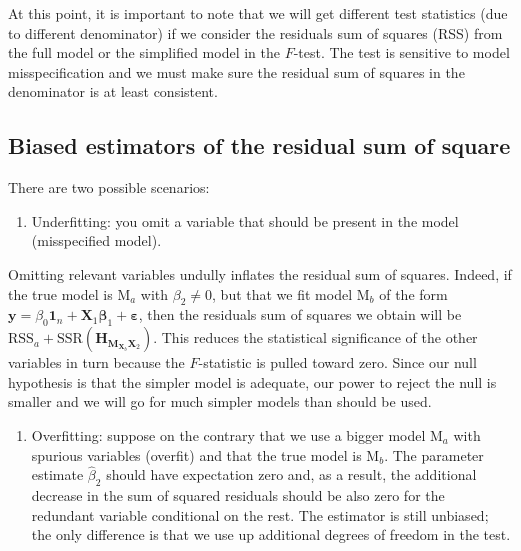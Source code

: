 \documentclass[]{book}
\providecommand{\tightlist}{%
  \setlength{\itemsep}{0pt}\setlength{\parskip}{0pt}}
\theoremstyle{definition}
\theoremstyle{definition}
\theoremstyle{definition}
\theoremstyle{remark}
\begin{document}
At this point, it is important to note that we will get different test statistics (due to different denominator) if we consider the residuals sum of squares (RSS) from the full model or the simplified model in the \(F\)-test. The test is sensitive to model misspecification and we must make sure the residual sum of squares in the denominator is at least consistent.

\hypertarget{biased-rss}{%
\subsection{Biased estimators of the residual sum of square}\label{biased-rss}}

There are two possible scenarios:

\begin{enumerate}
\def\labelenumi{\arabic{enumi}.}
\tightlist
\item
  Underfitting: you omit a variable that should be present in the model (misspecified model).
\end{enumerate}

Omitting relevant variables undully inflates the residual sum of squares. Indeed, if the true model is \(\mathrm{M}_a\) with \(\beta_2 \neq 0\), but that we fit model \(\mathrm{M}_b\) of the form \(\boldsymbol{y} = \beta_0\mathbf{1}_n + \mathbf{X}_1\boldsymbol{\beta}_1 + \boldsymbol{\varepsilon}\), then the residuals sum of squares we obtain will be \(\mathrm{RSS}_{a} + \mathrm{SSR}( \mathbf{H}_{\mathbf{M}_{\mathbf{X}_b}\mathbf{X}_2})\). This reduces the statistical significance of the other variables in turn because the \(F\)-statistic is pulled toward zero. Since our null hypothesis is that the simpler model is adequate, our power to reject the null is smaller and we will go for much simpler models than should be used.

\begin{enumerate}
\def\labelenumi{\arabic{enumi}.}
\setcounter{enumi}{1}
\tightlist
\item
  Overfitting: suppose on the contrary that we use a bigger model \(\mathrm{M}_a\) with spurious variables (overfit) and that the true model is \(\mathrm{M}_b\). The parameter estimate \(\hat{\beta}_2\) should have expectation zero and, as a result, the additional decrease in the sum of squared residuals should be also zero for the redundant variable conditional on the rest. The estimator is still unbiased; the only difference is that we use up additional degrees of freedom in the test.
\end{enumerate}
\end{document}
